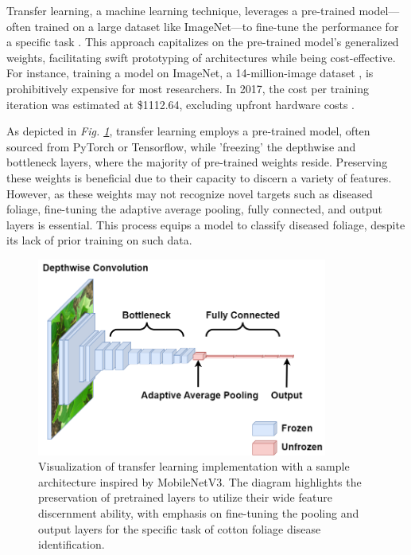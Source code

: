 \documentclass[conference]{IEEEtran}
\begin{document}
Transfer learning, a machine learning technique, leverages a pre-trained model—often trained on a large dataset like ImageNet—to fine-tune the performance for a specific task \cite{Shu}. This approach capitalizes on the pre-trained model's generalized weights, facilitating swift prototyping of architectures while being cost-effective. For instance, training a model on ImageNet, a 14-million-image dataset \cite{Reynolds}, is prohibitively expensive for most researchers. In 2017, the cost per training iteration was estimated at \$1112.64, excluding upfront hardware costs \cite{genuineimpact}.

As depicted in \emph{Fig. \ref{Transfer Learning}}, transfer learning employs a pre-trained model, often sourced from PyTorch or Tensorflow, while 'freezing' the depthwise and bottleneck layers, where the majority of pre-trained weights reside. Preserving these weights is beneficial due to their capacity to discern a variety of features. However, as these weights may not recognize novel targets such as diseased foliage, fine-tuning the adaptive average pooling, fully connected, and output layers is essential. This process equips a model to classify diseased foliage, despite its lack of prior training on such data.

\begin{figure}[h]
\centerline{\includegraphics[height=6.5cm, width=1\linewidth]{Images/MobileNetV3_layers.drawio.png}}
\caption{Visualization of transfer learning implementation with a sample architecture inspired by MobileNetV3. The diagram highlights the preservation of pretrained layers to utilize their wide feature discernment ability, with emphasis on fine-tuning the pooling and output layers for the specific task of cotton foliage disease identification.}
\label{Transfer Learning}
\end{figure}
\end{document}
